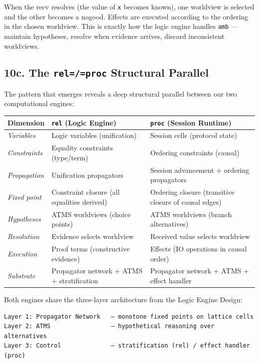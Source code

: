 \documentclass[11pt]{article}
\begin{document}
When the recv resolves (the value of \texttt{x} becomes known), one worldview is
selected and the other becomes a nogood. Effects are executed according to
the ordering in the chosen worldview. This is exactly how the logic engine
handles \texttt{amb} — maintain hypotheses, resolve when evidence arrives, discard
inconsistent worldviews.
\subsection{10c. The \texttt{rel=/=proc} Structural Parallel}
\label{sec:org05b1b36}

The pattern that emerges reveals a deep structural parallel between our two
computational engines:

\begin{center}
\begin{tabular}{lll}
Dimension & \texttt{rel} (Logic Engine) & \texttt{proc} (Session Runtime)\\
\hline
\emph{Variables} & Logic variables (unification) & Session cells (protocol state)\\
\emph{Constraints} & Equality constraints (type/term) & Ordering constraints (causal)\\
\emph{Propagation} & Unification propagators & Session advancement + ordering propagators\\
\emph{Fixed point} & Constraint closure (all equalities derived) & Ordering closure (transitive closure of causal edges)\\
\emph{Hypotheses} & ATMS worldviews (choice points) & ATMS worldviews (branch alternatives)\\
\emph{Resolution} & Evidence selects worldview & Received value selects worldview\\
\emph{Execution} & Proof terms (constructive evidence) & Effects (IO operations in causal order)\\
\emph{Substrate} & Propagator network + ATMS + stratification & Propagator network + ATMS + effect handler\\
\end{tabular}
\end{center}

Both engines share the three-layer architecture from the Logic Engine Design:

\begin{verbatim}
Layer 1: Propagator Network   — monotone fixed points on lattice cells
Layer 2: ATMS                 — hypothetical reasoning over alternatives
Layer 3: Control              — stratification (rel) / effect handler (proc)
\end{verbatim}
\end{document}
